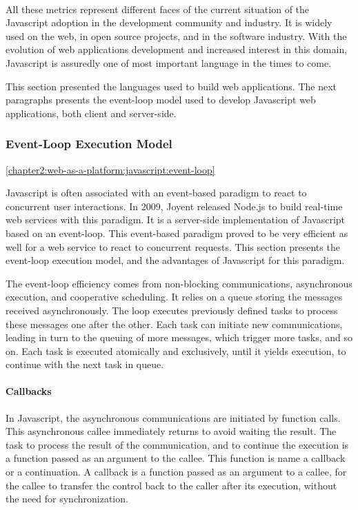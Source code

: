 \paragraph{}

All these metrics represent different faces of the current situation of the Javascript adoption in the development community and industry.
It is widely used on the web, in open source projects, and in the software industry.
With the evolution of web applications development and increased interest in this domain, Javascript is assuredly one of most important language in the times to come.

This section presented the languages used to build web applications.
The next paragraphs presents the event-loop model used to develop Javascript web applications, both client and server-side.

\subsubsection{Event-Loop Execution Model} \ref{chapter2:web-as-a-platform:javascript:event-loop}

Javascript is often associated with an event-based paradigm to react to concurrent user interactions.
In 2009, Joyent released Node.js to build real-time web services with this paradigm.
It is a server-side implementation of Javascript based on an event-loop.
This event-based paradigm proved to be very efficient as well for a web service to react to concurrent requests.
This section presents the event-loop execution model, and the advantages of Javascript for this paradigm.

The event-loop efficiency comes from non-blocking communications, asynchronous execution, and cooperative scheduling.
It relies on a queue storing the messages received asynchronously.
The loop executes previously defined tasks to process these messages one after the other.
Each task can initiate new communications, leading in turn to the queuing of more messages, which trigger more tasks, and so on.
Each task is executed atomically and exclusively, until it yields execution, to continue with the next task in queue.


\paragraph{Callbacks}

In Javascript, the asynchronous communications are initiated by function calls.
This asynchronous callee immediately returns to avoid waiting the result.
The task to process the result of the communication, and to continue the execution is a function passed as an argument to the callee.
This function is name a callback or a continuation.
A callback is a function passed as an argument to a callee, for the callee to transfer the control back to the caller after its execution, without the need for synchronization.

